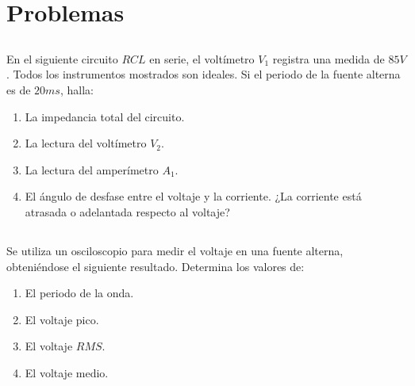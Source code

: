 \documentclass[../main.tex]{subfiles}
\begin{document}
\section{Problemas}%

\thispagestyle{fancy}

\subsection{}%

En el siguiente circuito $RCL$ en serie,
el voltímetro $V_1$ registra una medida de $85V$.
Todos los instrumentos mostrados son ideales.
Si el periodo de la fuente alterna es de $20ms$, halla:

\begin{enumerate}[label=\alph*)]
	\item La impedancia total del circuito.
	\item La lectura del voltímetro $V_2$.
	\item La lectura del amperímetro $A_1$.
	\item El ángulo de desfase entre el voltaje y la corriente.
		¿La corriente está atrasada o adelantada respecto al voltaje?
\end{enumerate}

\subsection{}%

Se utiliza un osciloscopio para medir el voltaje en una fuente alterna,
obteniéndose el siguiente resultado.
Determina los valores de:

\begin{enumerate}[label=\alph*)]
	\item El periodo de la onda.
	\item El voltaje pico.
	\item El voltaje $RMS$.
	\item El voltaje medio.
\end{enumerate}
\end{document}
